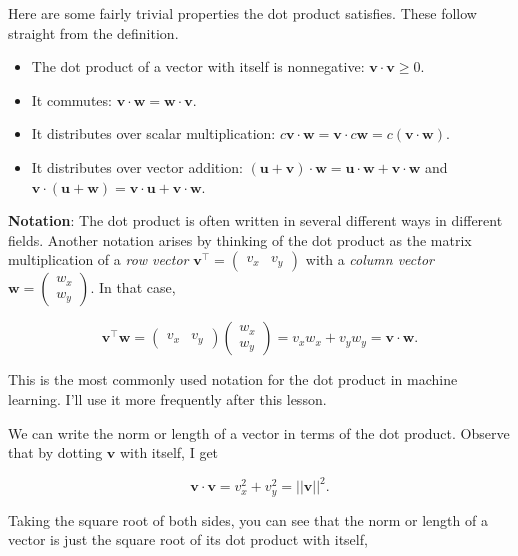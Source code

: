 \documentclass[
  letterpaper,
  DIV=11,
  numbers=noendperiod]{scrreprt}
\providecommand{\tightlist}{%
  \setlength{\itemsep}{0pt}\setlength{\parskip}{0pt}}\usepackage{longtable,booktabs,array}
\begin{document}
Here are some fairly trivial properties the dot product satisfies. These
follow straight from the definition.

\begin{itemize}
\tightlist
\item
  The dot product of a vector with itself is nonnegative:
  \(\mathbf{v} \cdot \mathbf{v} \geq 0\).
\item
  It commutes:
  \(\mathbf{v} \cdot \mathbf{w} = \mathbf{w} \cdot \mathbf{v}\).
\item
  It distributes over scalar multiplication:
  \(c\mathbf{v} \cdot \mathbf{w} = \mathbf{v} \cdot c\mathbf{w} = c(\mathbf{v} \cdot \mathbf{w})\).
\item
  It distributes over vector addition:
  \((\mathbf{u} + \mathbf{v}) \cdot \mathbf{w} = \mathbf{u} \cdot \mathbf{w} + \mathbf{v} \cdot \mathbf{w}\)
  and
  \(\mathbf{v} \cdot (\mathbf{u}+\mathbf{w}) = \mathbf{v} \cdot \mathbf{u} + \mathbf{v} \cdot \mathbf{w}\).
\end{itemize}

\textbf{Notation}: The dot product is often written in several different
ways in different fields. Another notation arises by thinking of the dot
product as the matrix multiplication of a \emph{row vector}
\(\mathbf{v}^\top = \begin{pmatrix}v_x & v_y \end{pmatrix}\) with a
\emph{column vector}
\(\mathbf{w} = \begin{pmatrix} w_x \\ w_y \end{pmatrix}\). In that case,

\[
\mathbf{v}^\top \mathbf{w} = 
\begin{pmatrix} v_x & v_y \end{pmatrix}
\begin{pmatrix} w_x \\ w_y \end{pmatrix}
= v_x w_x + v_y w_y = \mathbf{v} \cdot \mathbf{w}.
\]

This is the most commonly used notation for the dot product in machine
learning. I'll use it more frequently after this lesson.

We can write the norm or length of a vector in terms of the dot product.
Observe that by dotting \(\mathbf{v}\) with itself, I get

\[\mathbf{v} \cdot \mathbf{v} = v_x^2 + v_y^2 = ||\mathbf{v}||^2.\]

Taking the square root of both sides, you can see that the norm or
length of a vector is just the square root of its dot product with
itself,
\end{document}

